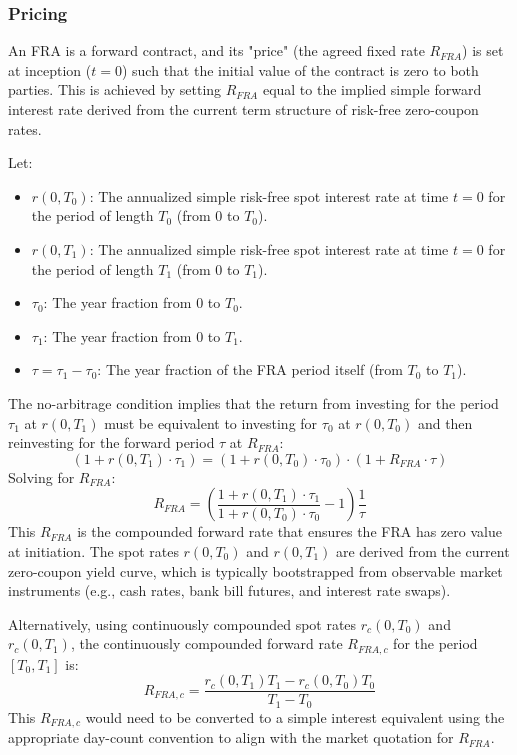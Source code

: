 \documentclass[11pt, a4paper, british]{article}
\begin{document}
\subsubsection{Pricing}
An FRA is a forward contract, and its "price" (the agreed fixed rate $R_{FRA}$) is set at inception ($t=0$) such that the initial value of the contract is zero to both parties. This is achieved by setting $R_{FRA}$ equal to the implied simple forward interest rate derived from the current term structure of risk-free zero-coupon rates.

Let:
\begin{itemize}
 \item $r(0, T_0)$: The annualized simple risk-free spot interest rate at time $t=0$ for the period of length $T_0$ (from $0$ to $T_0$).
 \item $r(0, T_1)$: The annualized simple risk-free spot interest rate at time $t=0$ for the period of length $T_1$ (from $0$ to $T_1$).
 \item $\tau_0$: The year fraction from $0$ to $T_0$.
 \item $\tau_1$: The year fraction from $0$ to $T_1$.
 \item $\tau = \tau_1 - \tau_0$: The year fraction of the FRA period itself (from $T_0$ to $T_1$).
\end{itemize}
The no-arbitrage condition implies that the return from investing for the period $\tau_1$ at $r(0, T_1)$ must be equivalent to investing for $\tau_0$ at $r(0, T_0)$ and then reinvesting for the forward period $\tau$ at $R_{FRA}$:
\begin{equation}
 (1 + r(0, T_1) \cdot \tau_1) = (1 + r(0, T_0) \cdot \tau_0) \cdot (1 + R_{FRA} \cdot \tau)
\end{equation}
Solving for $R_{FRA}$:
\begin{equation}
 R_{FRA} = \left( \frac{1 + r(0, T_1) \cdot \tau_1}{1 + r(0, T_0) \cdot \tau_0} - 1 \right) \frac{1}{\tau}
 \label{eq:fra_rate_simple_rigorous}
\end{equation}
This $R_{FRA}$ is the compounded forward rate that ensures the FRA has zero value at initiation. The spot rates $r(0, T_0)$ and $r(0, T_1)$ are derived from the current zero-coupon yield curve, which is typically bootstrapped from observable market instruments (e.g., cash rates, bank bill futures, and interest rate swaps).

Alternatively, using continuously compounded spot rates $r_c(0, T_0)$ and $r_c(0, T_1)$, the continuously compounded forward rate $R_{FRA,c}$ for the period $[T_0, T_1]$ is:
\begin{equation}
 R_{FRA,c} = \frac{r_c(0, T_1)T_1 - r_c(0, T_0)T_0}{T_1 - T_0}
 \label{eq:fra_rate_continuous_rigorous}
\end{equation}
This $R_{FRA,c}$ would need to be converted to a simple interest equivalent using the appropriate day-count convention to align with the market quotation for $R_{FRA}$.
\end{document}
